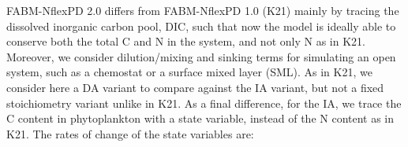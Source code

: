 \documentclass[gmd, manuscript]{copernicus}
\begin{document}
FABM-NflexPD 2.0 differs from FABM-NflexPD 1.0 (K21) 
mainly by tracing the dissolved inorganic carbon pool, DIC, such that now the model is ideally able to conserve both the total C and N in the system, and not only N as in K21. Moreover, we consider dilution/mixing and sinking terms for simulating an open system, such as a chemostat or a surface mixed layer (SML). As in K21, we consider here a DA variant to compare against the IA variant, but not a fixed stoichiometry variant unlike in K21. As a final difference, for the IA, we trace the C content in phytoplankton with a state variable, instead of the N content as in K21. The rates of change of the state variables are:
\end{document}
